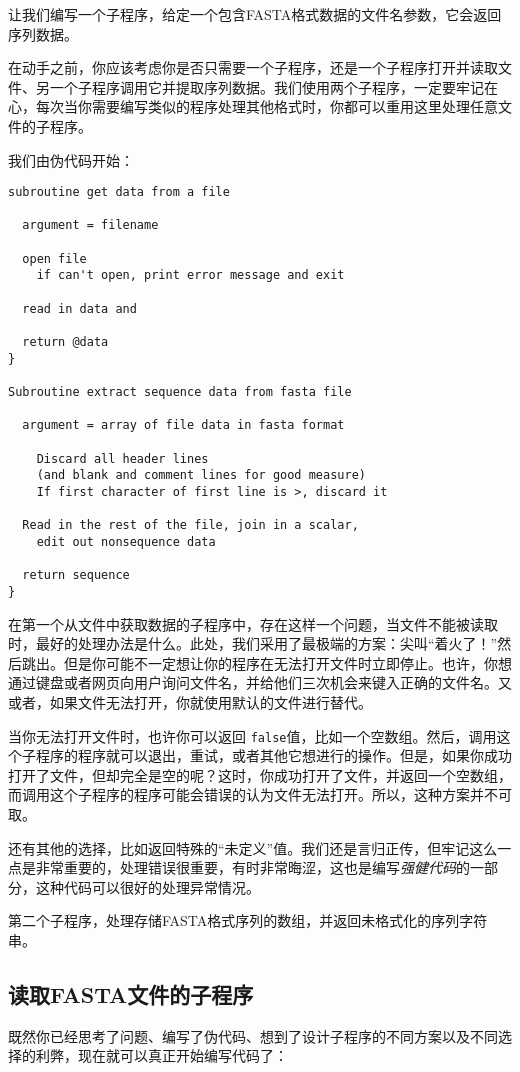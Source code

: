 让我们编写一个子程序，给定一个包含FASTA格式数据的文件名参数，它会返回序列数据。

在动手之前，你应该考虑你是否只需要一个子程序，还是一个子程序打开并读取文件、另一个子程序调用它并提取序列数据。我们使用两个子程序，一定要牢记在心，每次当你需要编写类似的程序处理其他格式时，你都可以重用这里处理任意文件的子程序。

我们由伪代码开始：

\begin{lstlisting}
subroutine get data from a file

  argument = filename

  open file
    if can't open, print error message and exit

  read in data and 

  return @data
}

Subroutine extract sequence data from fasta file

  argument = array of file data in fasta format

    Discard all header lines
    (and blank and comment lines for good measure)
    If first character of first line is >, discard it

  Read in the rest of the file, join in a scalar,
    edit out nonsequence data

  return sequence
}
\end{lstlisting}

在第一个从文件中获取数据的子程序中，存在这样一个问题，当文件不能被读取时，最好的处理办法是什么。此处，我们采用了最极端的方案：尖叫“着火了！”然后跳出。但是你可能不一定想让你的程序在无法打开文件时立即停止。也许，你想通过键盘或者网页向用户询问文件名，并给他们三次机会来键入正确的文件名。又或者，如果文件无法打开，你就使用默认的文件进行替代。

当你无法打开文件时，也许你可以返回 \verb|false|值，比如一个空数组。然后，调用这个子程序的程序就可以退出，重试，或者其他它想进行的操作。但是，如果你成功打开了文件，但却完全是空的呢？这时，你成功打开了文件，并返回一个空数组，而调用这个子程序的程序可能会错误的认为文件无法打开。所以，这种方案并不可取。

还有其他的选择，比如返回特殊的“未定义”值。我们还是言归正传，但牢记这么一点是非常重要的，处理错误很重要，有时非常晦涩，这也是编写\textit{强健代码}的一部分，这种代码可以很好的处理异常情况。

第二个子程序，处理存储FASTA格式序列的数组，并返回未格式化的序列字符串。

\subsection{读取FASTA文件的子程序}
既然你已经思考了问题、编写了伪代码、想到了设计子程序的不同方案以及不同选择的利弊，现在就可以真正开始编写代码了：

